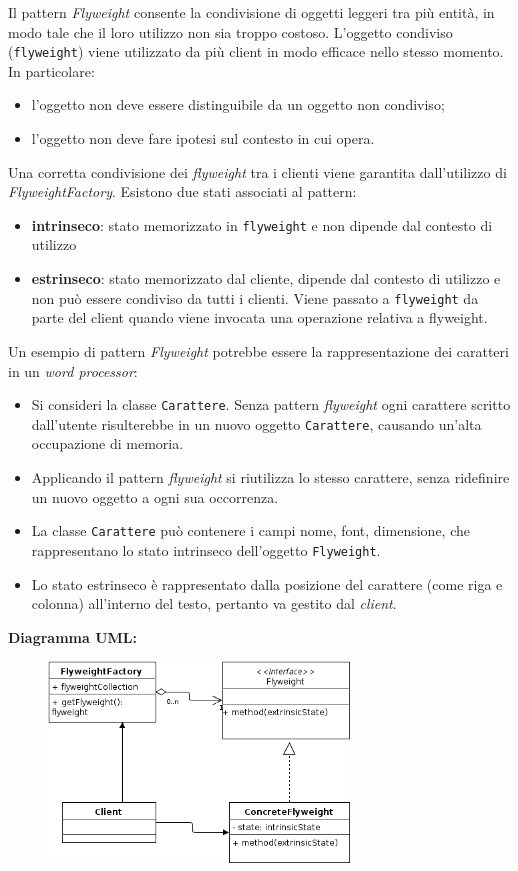 \begin{solution}
Il pattern \textit{Flyweight} consente la condivisione di oggetti leggeri tra più entità, in modo tale che il loro utilizzo non sia troppo costoso.
L'oggetto condiviso (\texttt{flyweight}) viene utilizzato da più client in modo efficace nello stesso momento.
In particolare:
\begin{itemize}
	\item l'oggetto non deve essere distinguibile da un oggetto non condiviso;
	\item l'oggetto non deve fare ipotesi sul contesto in cui opera.
\end{itemize}
Una corretta condivisione dei \textit{flyweight} tra i clienti viene garantita dall'utilizzo di \textit{FlyweightFactory}.
Esistono due stati associati al pattern:
\begin{itemize}
	\item \textbf{intrinseco}: stato memorizzato in \texttt{flyweight} e non dipende dal contesto di utilizzo
	\item \textbf{estrinseco}: stato memorizzato dal cliente, dipende dal contesto di utilizzo e non può essere condiviso da tutti i clienti.
	Viene passato a \texttt{flyweight} da parte del client quando viene invocata una operazione relativa a flyweight.
\end{itemize}
Un esempio di pattern \textit{Flyweight} potrebbe essere la rappresentazione dei caratteri in un \textit{word processor}:
\begin{itemize}
	\item Si consideri la classe \texttt{Carattere}. Senza pattern \textit{flyweight} ogni carattere scritto dall'utente risulterebbe in un nuovo oggetto \texttt{Carattere}, causando un'alta occupazione di memoria.
	\item Applicando il pattern \textit{flyweight} si riutilizza lo stesso carattere, senza ridefinire un nuovo oggetto a ogni sua occorrenza.
	\item La classe \texttt{Carattere} può contenere i campi nome, font, dimensione, che rappresentano lo stato intrinseco dell'oggetto \texttt{Flyweight}.
	\item Lo stato estrinseco è rappresentato dalla posizione del carattere (come riga e colonna) all'interno del testo, pertanto va gestito dal \textit{client}.
\end{itemize}
\newpage
\textbf{Diagramma UML:}
\begin{figure}[htb!]
	\centering
	\label{FlyweightPattern}
	\includegraphics[width=8cm]{./immagini/flyweightPattern.png}
\end{figure}
\end{solution}

